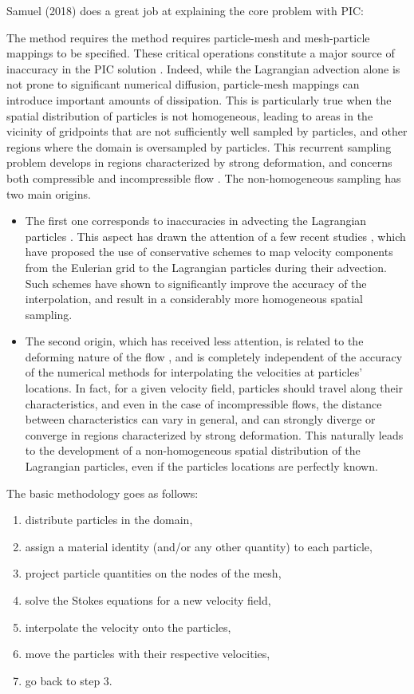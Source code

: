 Samuel (2018) \cite{samu18} does a great job at explaining 
the core problem with PIC: 
\begin{displayquote}
{\color{darkgray}
The method requires the method requires particle-mesh 
and mesh-particle mappings to be specified. These critical operations constitute a
major source of inaccuracy in the PIC solution \cite{mona85,dumg11,thmk14}. 
Indeed, while the Lagrangian advection alone is not prone
to significant numerical diffusion, particle-mesh mappings can introduce 
important amounts of dissipation. This is particularly true
when the spatial distribution of particles is not homogeneous, leading 
to areas in the vicinity of gridpoints that are not sufficiently
well sampled by particles, and other regions where the domain is
oversampled by particles. This recurrent sampling problem develops 
in regions characterized by strong deformation, and concerns
both compressible and incompressible flow \cite{waav15,pukp16}. 
The non-homogeneous sampling has two main origins. 
\begin{itemize}
\item The first one corresponds to inaccuracies in advecting the
Lagrangian particles \cite{meje04}. This aspect has drawn
the attention of a few recent studies \cite{waav15,pukp16}, 
which have proposed the use of conservative schemes to
map velocity components from the Eulerian grid to the Lagrangian
particles during their advection. Such schemes have shown to significantly 
improve the accuracy of the interpolation, and result in
a considerably more homogeneous spatial sampling. \\
\item The second origin, which has received less attention, is related to the deforming
nature of the flow \cite{modm03}, and is completely independent 
of the accuracy of the numerical methods for interpolating
the velocities at particles' locations. In fact, for a given velocity
field, particles should travel along their characteristics, and even in
the case of incompressible flows, the distance between characteristics 
can vary in general, and can strongly diverge or converge in
regions characterized by strong deformation. This naturally leads to
the development of a non-homogeneous spatial distribution of the
Lagrangian particles, even if the particles locations are perfectly
known.
\end{itemize}
}
\end{displayquote}


The basic methodology goes as follows:
\begin{enumerate}
\item distribute particles in the domain,
\item assign a material identity (and/or any other quantity) to each particle,
\item project particle quantities on the  nodes of the mesh,
\item solve the Stokes equations for a new velocity field,
\item interpolate the velocity onto the particles,
\item move the particles with their respective velocities, 
\item go back to step 3.
\end{enumerate}  

